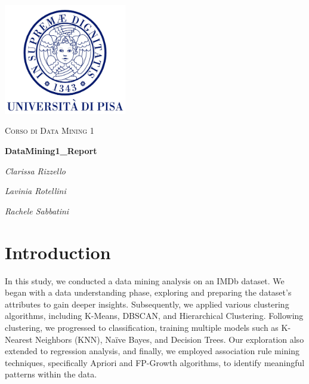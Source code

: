 \documentclass[10pt]{article}
\begin{document}
\setlength{\parindent}{0pt}    %
\setlength{\parskip}{6pt}

\begin{titlepage}
    \centering
    \vspace*{2cm}
    
    \includegraphics[width=0.4\textwidth]{image.jpg}\par
    \vspace{1.5cm}
    
    {\scshape\Large Corso di Data Mining 1 \par}
    
    \vspace{2cm}
    {\huge\bfseries DataMining1\_Report \par}
    
    \vspace{2.5cm}
    {\Large\itshape Clarissa Rizzello\par}
    \vspace{0.5cm}
    {\Large\itshape Lavinia Rotellini\par}
    \vspace{0.5cm}
    {\Large\itshape Rachele Sabbatini\par}
    
    \vfill
\end{titlepage}

\tableofcontents
\newpage

\section{Introduction}
In this study, we conducted a data mining analysis on an IMDb dataset. We began with a data understanding phase, exploring and preparing the dataset’s attributes to gain deeper insights. Subsequently, we applied various clustering algorithms, including K-Means, DBSCAN, and Hierarchical Clustering. Following clustering, we progressed to classification, training multiple models such as K-Nearest Neighbors (KNN), Naïve Bayes, and Decision Trees. Our exploration also extended to regression analysis, and finally, we employed association rule mining techniques, specifically Apriori and FP-Growth algorithms, to identify meaningful patterns within the data.
\end{document}
